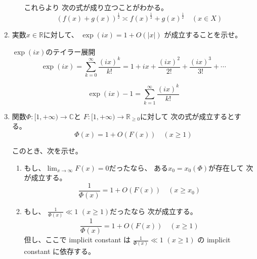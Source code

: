 \documentclass[12pt,b5paper]{ltjsarticle}
\begin{document}
\begin{enumerate}
\begin{enumerate}
            これらより
            次の式が成り立つことがわかる。
            \begin{equation}
             (f(x)+g(x))^{\frac{1}{2}}
              \asymp
              f(x)^{\frac{1}{2}}+g(x)^{\frac{1}{2}} \quad (x\in X)
            \end{equation}



            \hrulefill

      \end{enumerate}


 \item
      実数$x\in\mathbb{R}$に対して、
      $\exp(ix) = 1+O(\lvert x \rvert)$
      が成立することを示せ。

      \dotfill

      $\exp(ix)$のテイラー展開
      \begin{equation}
       \exp(ix)
        = \sum_{k=0}^{\infty} \frac{(ix)^{k}}{k!}
        = 1 + ix + \frac{(ix)^{2}}{2!} + \frac{(ix)^{3}}{3!} + \cdots
      \end{equation}

      \begin{equation}
       \exp(ix) -1
        = \sum_{k=1}^{\infty} \frac{(ix)^{k}}{k!}
      \end{equation}

      \hrulefill


 \item
      関数$\Phi:[1,+\infty)\to\mathbb{C}$と
      $F:[1,+\infty)\to\mathbb{R}_{\geq 0}$に対して
      次の式が成立するとする。
      \begin{equation}
       \Phi(x) = 1+ O(F(x)) \quad (x\geq 1)
      \end{equation}
      
      このとき、次を示せ。
      \begin{enumerate}
       \item
            もし、$\displaystyle \lim_{x\to\infty}F(x)=0$だったなら、
            ある$x_{0}=x_{0}(\Phi)$が存在して
            次が成立する。
            \begin{equation}
             \frac{1}{\Phi(x)}= 1+ O(F(x)) \quad (x\geq x_{0})
            \end{equation}

            \dotfill

            \hrulefill

       \item
            もし、
            $\frac{1}{\Phi(x)} \ll 1$ $(x\geq 1)$だったなら
            次が成立する。
            \begin{equation}
             \frac{1}{\Phi(x)}= 1+ O(F(x)) \quad (x\geq 1)
            \end{equation}
            但し、ここで implicit constant は
            $\frac{1}{\Phi(x)} \ll 1$ $(x\geq 1)$
            の implicit constant に依存する。


\end{enumerate}
\end{enumerate}
\end{document}
